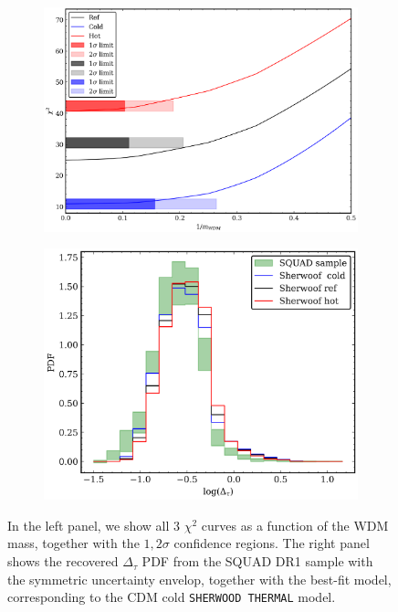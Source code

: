 \begin{figure}
    \centering
    \begin{subfigure}[b]{0.53\textwidth}
        \centering
            \includegraphics[width=1\textwidth]{img/ML/squad_chi.png}
    
    \end{subfigure}
    \hfill
    \begin{subfigure}[b]{0.45\textwidth}
        \centering
        \includegraphics[width=1\textwidth]{img/ML/squad_fit_pdf.png}     
    \end{subfigure}
        \caption{In the left panel, we show all 3 $\chi^2$ curves as a function of the WDM mass, together with the $1,2\sigma$ confidence regions. The right panel shows the recovered $\Delta_\tau$ PDF from the SQUAD DR1 sample with the symmetric uncertainty envelop, together with the best-fit model, corresponding to the CDM cold \texttt{SHERWOOD THERMAL} model.
        }
        \label{fig: squad chi pdf}
\end{figure}










